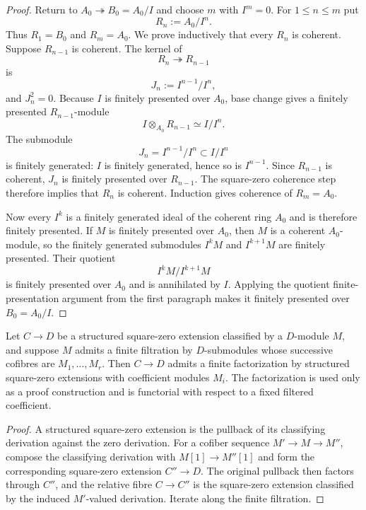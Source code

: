 \begin{proof}
Return to $A_0\twoheadrightarrow B_0=A_0/I$ and choose $m$ with $I^m=0$.
For $1\leq n\leq m$ put
\[
    R_n:=A_0/I^n.
\]
Thus $R_1=B_0$ and $R_m=A_0$.  We prove inductively that every $R_n$ is
coherent.  Suppose $R_{n-1}$ is coherent.  The kernel of
\[
    R_n\twoheadrightarrow R_{n-1}
\]
is
\[
    J_n:=I^{n-1}/I^n,
\]
and $J_n^2=0$.  Because $I$ is finitely presented over $A_0$, base change
gives a finitely presented $R_{n-1}$-module
\[
    I\otimes_{A_0}R_{n-1}
    \simeq
    I/I^n.
\]
The submodule
\[
    J_n=I^{n-1}/I^n
    \subset
    I/I^n
\]
is finitely generated: $I$ is finitely generated, hence so is $I^{n-1}$.
Since $R_{n-1}$ is coherent, $J_n$ is finitely presented over $R_{n-1}$.
The square-zero coherence step therefore implies that $R_n$ is coherent.
Induction gives coherence of $R_m=A_0$.

Now every $I^k$ is a finitely generated ideal of the coherent ring $A_0$ and
is therefore finitely presented.  If $M$ is finitely presented over $A_0$,
then $M$ is a coherent $A_0$-module, so the finitely generated submodules
$I^kM$ and $I^{k+1}M$ are finitely presented.  Their quotient
\[
    I^kM/I^{k+1}M
\]
is finitely presented over $A_0$ and is annihilated by $I$.  Applying the
quotient finite-presentation argument from the first paragraph makes it
finitely presented over $B_0=A_0/I$.
\end{proof}

\begin{lemma}
\label{lem:bnla-refine-square-zero-filtration}
Let $C\to D$ be a structured square-zero extension classified by a
$D$-module $M$, and suppose $M$ admits a finite filtration by $D$-submodules
whose successive cofibres are $M_1,\ldots,M_r$.  Then $C\to D$ admits a
finite factorization by structured square-zero extensions with coefficient
modules $M_i$.  The factorization is used only as a proof construction and is
functorial with respect to a fixed filtered coefficient.
\end{lemma}

\begin{proof}
A structured square-zero extension is the pullback of its classifying
derivation against the zero derivation.  For a cofiber sequence
$M'\to M\to M''$, compose the classifying derivation with
$M[1]\to M''[1]$ and form the corresponding square-zero extension $C''\to D$.
The original pullback then factors through $C''$, and the relative fibre
$C\to C''$ is the square-zero extension classified by the induced
$M'$-valued derivation.  Iterate along the finite filtration.
\end{proof}

